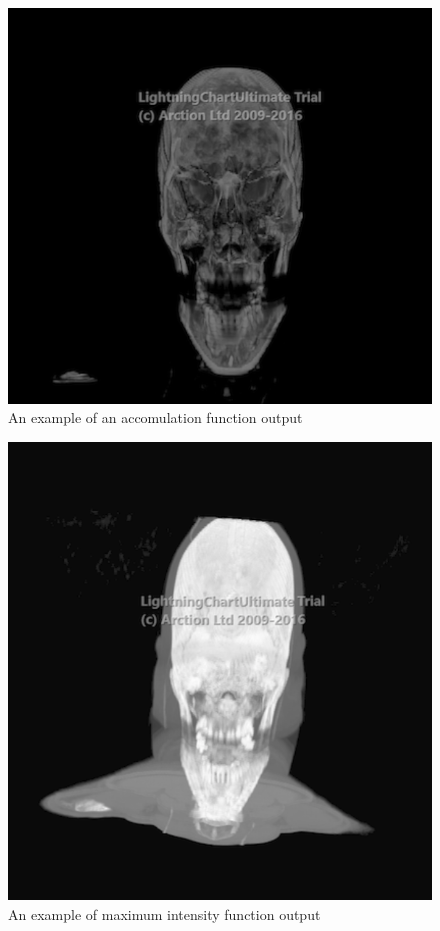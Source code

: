 \documentclass[twoside, english, 11pt]{report}
\begin{document}
\begin{figure}[!h]
\centerline{\includegraphics[scale = 0.45]{img/accum}}
\caption{An example of an accomulation function output\label{fig:accum}}
\end{figure}\begin{figure}[!h]
\centerline{\includegraphics[scale = 0.45]{img/maxi}}
\caption{An example of maximum intensity function output\label{fig:maxi}}
\end{figure}
\end{document}
